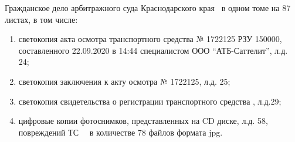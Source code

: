 Гражданское дело арбитражного суда Краснодарского края \delonum \, в одном томе на 87 листах, в том числе:
\begin{enumerate}
	\item светокопия акта осмотра транспортного средства № 1722125 РЗУ 150000, составленного 22.09.2020 в 14:44 специалистом ООО \enquote{АТБ-Саттелит}, л.д. 24;
	\item светокопия заключения к акту осмотра № 1722125, л.д. 25;
	\item светокопия свидетельства о регистрации транспортного средства , л.д.29;
	\item  цифровые копии  фотоснимков, представленных на CD диске, л.д. 58,  повреждений ТС  \,  \, в количестве 78 файлов формата jpg.   

\end{enumerate}